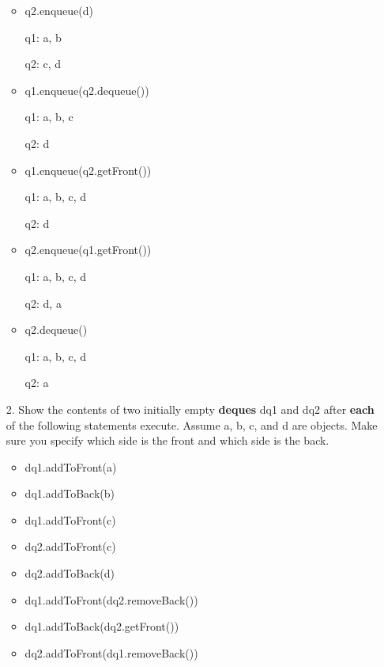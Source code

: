 \documentclass[10pt]{article}
\begin{document}
\begin{enumerate}
\begin{itemize}
				\item q2.enqueue(d)
					
					q1: a, b
					
					q2: c, d
				
				\item q1.enqueue(q2.dequeue())
					
					q1: a, b, c
					
					q2: d
				
				\item q1.enqueue(q2.getFront())
					
					q1: a, b, c, d
					
					q2: d
				
				\item q2.enqueue(q1.getFront())
					
					q1: a, b, c, d
					
					q2: d, a
				
				\item q2.dequeue()
					
					q1: a, b, c, d
					
					q2: a
			\end{itemize}
			\vspace{0.5cm}
		
		\item[2.] Show the contents of two initially empty \textbf{deques} dq1 and dq2 after \textbf{each} of the following statements execute. Assume a, b, c, and d are objects. Make sure you specify which side is the front and which side is the back.
			
			\begin{itemize}
				\item dq1.addToFront(a)
				
				\item dq1.addToBack(b)
				
				\item dq1.addToFront(c)
				
				\item dq2.addToFront(c)
				
				\item dq2.addToBack(d)
				
				\item dq1.addToFront(dq2.removeBack())
				
				\item dq1.addToBack(dq2.getFront())
				
				\item dq2.addToFront(dq1.removeBack())
				

\end{itemize}
\end{enumerate}
\end{document}
